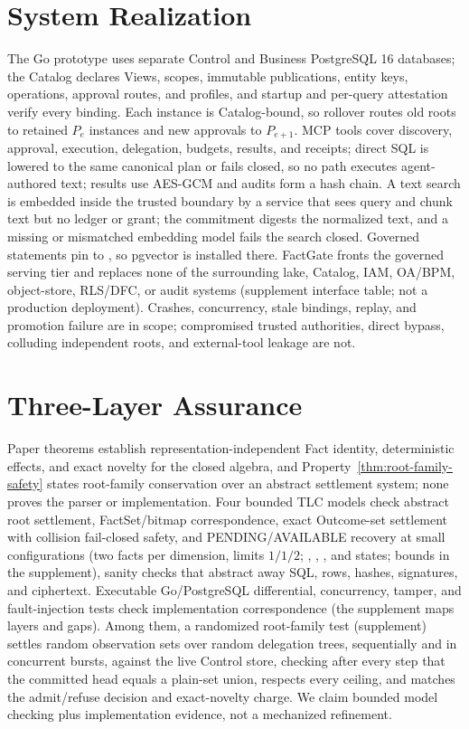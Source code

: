 \documentclass[10pt,journal,compsoc]{IEEEtran}
\newcommand{\system}{FactGate\xspace}
\newcommand{\code}[1]{\texttt{\detokenize{#1}}}
\begin{document}
\section{System Realization}
\label{sec:system}

The Go prototype uses separate Control and Business PostgreSQL 16
databases; the Catalog declares Views, scopes, immutable publications,
entity keys, operations, approval routes, and profiles, and startup and
per-query attestation verify every binding. Each instance is
Catalog-bound, so rollover routes old roots to retained $P_e$ instances
and new approvals to $P_{e+1}$. MCP tools cover discovery, approval,
execution, delegation, budgets, results, and receipts; direct SQL is
lowered to the same canonical plan or fails closed, so no path executes
agent-authored text; results use AES-GCM and audits form a hash chain.
A text search is embedded inside the trusted boundary by a service that
sees query and chunk text but no ledger or grant; the commitment digests
the normalized text, and a missing or mismatched embedding model fails the
search closed. Governed statements pin \code{search_path} to
\code{pg_catalog}, so pgvector is installed there.
\system fronts the governed serving tier and replaces none of the
surrounding lake, Catalog, IAM, OA/BPM, object-store, RLS/DFC, or audit
systems (supplement interface table; not a production deployment).
Crashes, concurrency, stale bindings, replay, and promotion failure are in
scope; compromised trusted authorities, direct bypass, colluding
independent roots, and external-tool leakage are not.

\section{Three-Layer Assurance}
\label{sec:formal}

Paper theorems establish representation-independent Fact identity,
deterministic effects, and exact novelty for the closed algebra, and
Property~\ref{thm:root-family-safety} states root-family conservation over an
abstract settlement system; none proves the parser or implementation. Four
bounded TLC models \cite{lamport2002specifying} check abstract root
settlement, FactSet/bitmap correspondence, exact Outcome-set settlement with
collision fail-closed safety, and PENDING/AVAILABLE recovery at small
configurations (two facts per dimension, limits $1/1/2$;
\ExposureFormalStates{}, \BitmapFormalStates{}, \OutcomeFormalStates{},
and \ArtifactFormalStates{} states; bounds in the supplement), sanity
checks that abstract away SQL, rows, hashes, signatures, and ciphertext. Executable Go/PostgreSQL differential, concurrency, tamper, and
fault-injection tests check implementation correspondence (the supplement
maps layers and gaps). Among them, a randomized root-family test
(supplement) settles random observation sets over random delegation trees,
sequentially and in concurrent bursts, against the live Control store,
checking after every step that the committed head equals a plain-set
union, respects every ceiling, and matches the admit/refuse decision and
exact-novelty charge. We claim bounded model checking plus implementation
evidence, not a mechanized refinement.
\end{document}
